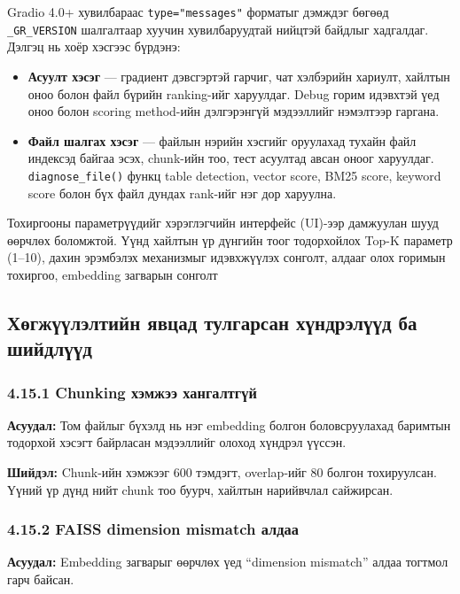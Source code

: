 \documentclass[11pt,a4paper]{article}
\begin{document}
Gradio 4.0+ хувилбараас \texttt{type="messages"} форматыг дэмждэг бөгөөд \texttt{\_GR\_VERSION} шалгалтаар хуучин хувилбаруудтай нийцтэй байдлыг хадгалдаг. Дэлгэц нь хоёр хэсгээс бүрдэнэ:

\begin{itemize}
      \item \textbf{Асуулт хэсэг} --- градиент дэвсгэртэй гарчиг, чат хэлбэрийн хариулт, хайлтын оноо болон файл бүрийн ranking-ийг харуулдаг. Debug горим идэвхтэй үед оноо болон scoring method-ийн дэлгэрэнгүй мэдээллийг нэмэлтээр гаргана.
      \item \textbf{Файл шалгах хэсэг} --- файлын нэрийн хэсгийг оруулахад тухайн файл индексэд байгаа эсэх, chunk-ийн тоо, тест асуултад авсан оноог харуулдаг. \texttt{diagnose\_file()} функц table detection, vector score, BM25 score, keyword score болон бүх файл дундах rank-ийг нэг дор харуулна.
\end{itemize}

Тохиргооны параметрүүдийг хэрэглэгчийн интерфейс (UI)-ээр дамжуулан шууд өөрчлөх боломжтой. Үүнд хайлтын үр дүнгийн тоог тодорхойлох Top-K параметр (1–10), дахин эрэмбэлэх механизмыг идэвхжүүлэх сонголт, алдааг олох горимын тохиргоо, embedding загварын сонголт
\subsection{Хөгжүүлэлтийн явцад тулгарсан хүндрэлүүд ба шийдлүүд}

\subsubsection*{4.15.1 Chunking хэмжээ хангалтгүй}

\textbf{Асуудал:} Том файлыг бүхэлд нь нэг embedding болгон боловсруулахад баримтын тодорхой хэсэгт байрласан мэдээллийг олоход хүндрэл үүссэн.

\textbf{Шийдэл:} Chunk-ийн хэмжээг 600 тэмдэгт, overlap-ийг 80 болгон тохируулсан. Үүний үр дүнд нийт chunk тоо буурч, хайлтын нарийвчлал сайжирсан.

\subsubsection*{4.15.2 FAISS dimension mismatch алдаа}

\textbf{Асуудал:} Embedding загварыг өөрчлөх үед ``dimension mismatch'' алдаа тогтмол гарч байсан.
\end{document}
